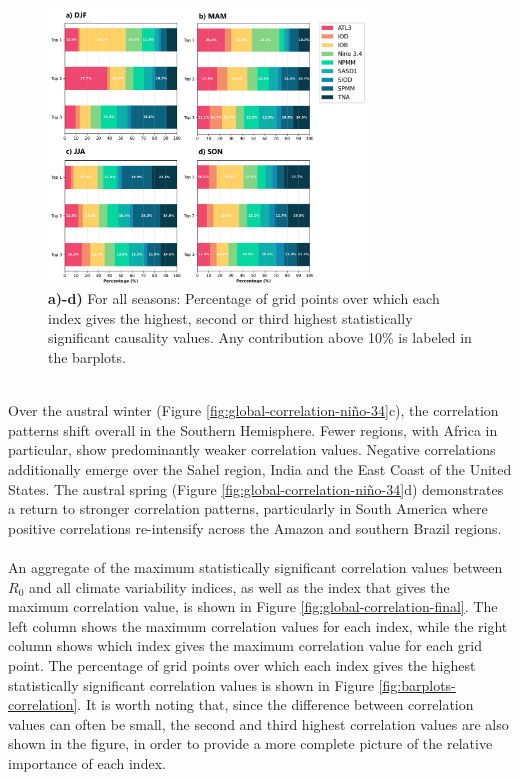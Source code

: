 \documentclass[10pt,twocolumn]{wlscirep}
\begin{document}
\begin{figure}[!ht]
  \centering
  \includegraphics[width=0.75\textwidth]{causality_barplots.png}
  \caption{\textbf{a)-d)} For all seasons: Percentage of grid points over which each index gives the highest, second or third highest statistically significant causality values. Any contribution above 10\% is labeled in the barplots.}
  \label{fig:causality-barplots}
\end{figure}
\noindent
\\
Over the austral winter (Figure \ref{fig:global-correlation-niño-34}c), the correlation patterns shift overall in the Southern Hemisphere. Fewer regions, with Africa in particular, show predominantly weaker correlation values. Negative correlations additionally emerge over the Sahel region, India and the East Coast of the United States. The austral spring (Figure \ref{fig:global-correlation-niño-34}d) demonstrates a return to stronger correlation patterns, particularly in South America where positive correlations re-intensify across the Amazon and southern Brazil regions.
\\
\\
An aggregate of the maximum statistically significant correlation values between $R_0$ and all climate variability indices, as well as the index that gives the maximum correlation value, is shown in Figure \ref{fig:global-correlation-final}. The left column shows the maximum correlation values for each index, while the right column shows which index gives the maximum correlation value for each grid point. The percentage of grid points over which each index gives the highest statistically significant correlation values is shown in Figure \ref{fig:barplots-correlation}. It is worth noting that, since the difference between correlation values can often be small, the second and third highest correlation values are also shown in the figure, in order to provide a more complete picture of the relative importance of each index.
\end{document}

